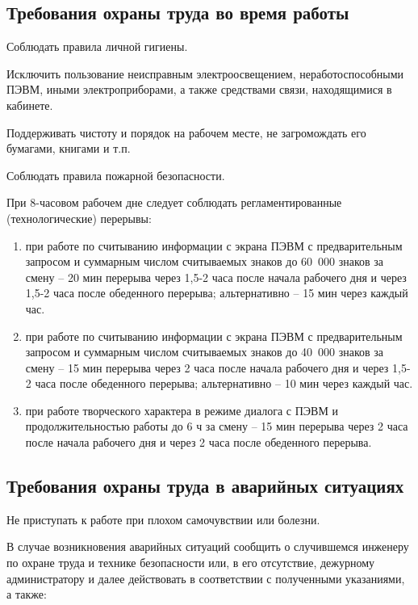 \tocless\subsection{Требования охраны труда во время работы}


    Соблюдать правила личной гигиены.

    Исключить пользование неисправным электроосвещением, неработоспособными ПЭВМ, иными электроприборами, а также средствами связи, находящимися в кабинете.

    Поддерживать чистоту и порядок на рабочем месте, не загромождать его бумагами, книгами и т.п.

    Соблюдать правила пожарной безопасности.

    При 8-часовом рабочем дне следует соблюдать регламентированные (технологические) перерывы:
\begin{enumerate}
        \item при работе по считыванию информации с экрана ПЭВМ с предварительным запросом и суммарным числом считываемых знаков до 60 000 знаков за смену – 20 мин перерыва через 1,5-2 часа после начала рабочего дня и через 1,5-2 часа после обеденного перерыва; альтернативно – 15 мин через каждый час.
        \item при работе по считыванию информации с экрана ПЭВМ с предварительным запросом и суммарным числом считываемых знаков до 40 000 знаков за смену –  15 мин перерыва через 2 часа после начала рабочего дня и через 1,5-2 часа после обеденного перерыва; альтернативно – 10 мин через каждый час.
        \item при работе творческого характера в режиме диалога с ПЭВМ и продолжительностью работы до 6 ч за смену –  15 мин перерыва через 2 часа после начала рабочего дня и через 2 часа после обеденного перерыва.
\end{enumerate}


\tocless\subsection{Требования охраны труда в аварийных ситуациях}


    Не приступать к работе при плохом самочувствии или болезни.

    В случае возникновения аварийных ситуаций сообщить о случившемся инженеру по охране труда и технике безопасности или, в его отсутствие, дежурному администратору и далее действовать в соответствии с полученными указаниями, а также:

